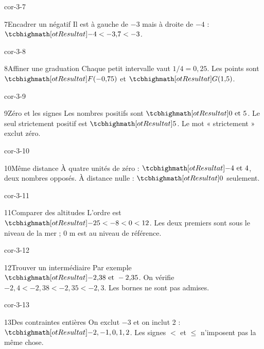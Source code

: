\begin{blocLivre}{cor-3-7}\begin{corrige}{7}{Encadrer un négatif}
Il est à gauche de $-3$ mais à droite de $-4$ : $\res{-4<-3{,}7<-3}$.
\end{corrige}\end{blocLivre}
\begin{blocLivre}{cor-3-8}\begin{corrige}{8}{Affiner une graduation}
Chaque petit intervalle vaut $1/4=0{,}25$. Les points sont $\res{F(-0{,}75)}$ et $\res{G(1{,}5)}$.
\label{fig-cor-3-8}
\end{corrige}\end{blocLivre}
\begin{blocLivre}{cor-3-9}\begin{corrige}{9}{Zéro et les signes}
Les nombres positifs sont $\res{0\text{ et }5}$. Le seul strictement positif est $\res5$. Le mot « strictement » exclut zéro.
\end{corrige}\end{blocLivre}
\begin{blocLivre}{cor-3-10}\begin{corrige}{10}{Même distance}
À quatre unités de zéro : $\res{-4\text{ et }4}$, deux nombres opposés. À distance nulle : $\res0$ seulement.
\end{corrige}\end{blocLivre}
\begin{blocLivre}{cor-3-11}\begin{corrige}{11}{Comparer des altitudes}
L’ordre est $\res{-25<-8<0<12}$. Les deux premiers sont sous le niveau de la mer ; 0 m est au niveau de référence.
\end{corrige}\end{blocLivre}
\begin{blocLivre}{cor-3-12}\begin{corrige}{12}{Trouver un intermédiaire}
Par exemple $\res{-2{,}38\text{ et }-2{,}35}$. On vérifie $-2{,}4<-2{,}38<-2{,}35<-2{,}3$. Les bornes ne sont pas admises.
\end{corrige}\end{blocLivre}
\begin{blocLivre}{cor-3-13}\begin{corrige}{13}{Des contraintes entières}
On exclut $-3$ et on inclut 2 : $\res{-2,-1,0,1,2}$. Les signes $<$ et $\le$ n’imposent pas la même chose.
\end{corrige}\end{blocLivre}
